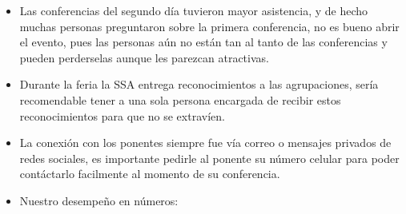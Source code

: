 \documentclass[a4paper,11pt]{article}                 %
\begin{document}
\begin{itemize}
    \item Las conferencias del segundo día tuvieron mayor asistencia, y de hecho muchas personas preguntaron sobre la primera conferencia, no es bueno abrir el evento, pues las personas aún no están tan al tanto de las conferencias y pueden perderselas aunque les parezcan atractivas.
    
    \item Durante la feria la SSA entrega reconocimientos a las agrupaciones, sería recomendable tener a una sola persona encargada de recibir estos reconocimientos para que no se extravíen.
    
    \item La conexión con los ponentes siempre fue vía correo o mensajes privados de redes sociales, es importante pedirle al ponente su número celular para poder contáctarlo facilmente al momento de su conferencia.
    
    \item Nuestro desempeño en números:
    

\end{itemize}
\end{document}
